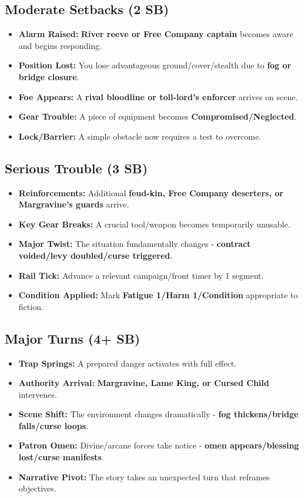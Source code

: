 \subsection*{Moderate Setbacks (2 SB)}
\begin{itemize}
\item \textbf{Alarm Raised:} \textbf{River reeve or Free Company captain} becomes aware and begins responding.
\item \textbf{Position Lost:} You lose advantageous ground/cover/stealth due to \textbf{fog or bridge closure}.
\item \textbf{Foe Appears:} A \textbf{rival bloodline or toll-lord's enforcer} arrives on scene.
\item \textbf{Gear Trouble:} A piece of equipment becomes \textbf{Compromised/Neglected}.
\item \textbf{Lock/Barrier:} A simple obstacle now requires a test to overcome.
\end{itemize}

\subsection*{Serious Trouble (3 SB)}
\begin{itemize}
\item \textbf{Reinforcements:} Additional \textbf{feud-kin, Free Company deserters, or Margravine's guards} arrive.
\item \textbf{Key Gear Breaks:} A crucial tool/weapon becomes temporarily unusable.
\item \textbf{Major Twist:} The situation fundamentally changes - \textbf{contract voided/levy doubled/curse triggered}.
\item \textbf{Rail Tick:} Advance a relevant campaign/front timer by 1 segment.
\item \textbf{Condition Applied:} Mark \textbf{Fatigue 1/Harm 1/Condition} appropriate to fiction.
\end{itemize}

\subsection*{Major Turns (4+ SB)}
\begin{itemize}
\item \textbf{Trap Springs:} A prepared danger activates with full effect.
\item \textbf{Authority Arrival:} \textbf{Margravine, Lame King, or Cursed Child} intervenes.
\item \textbf{Scene Shift:} The environment changes dramatically - \textbf{fog thickens/bridge falls/curse loops}.
\item \textbf{Patron Omen:} Divine/arcane forces take notice - \textbf{omen appears/blessing lost/curse manifests}.
\item \textbf{Narrative Pivot:} The story takes an unexpected turn that reframes objectives.
\end{itemize}

